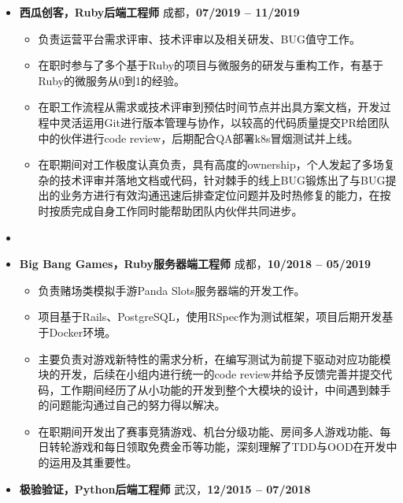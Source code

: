 \documentclass[11pt, a4paper,sans]{moderncv}   %
\begin{document}
\begin{itemize}
\item{\yahei \textbf{西瓜创客，Ruby后端工程师} \hfill 成都，\textbf{07/2019 -- 11/2019}}
\begin{itemize}\yahei
  \item 负责运营平台需求评审、技术评审以及相关研发、BUG值守工作。
  \item 在职时参与了多个基于Ruby的项目与微服务的研发与重构工作，有基于Ruby的微服务从0到1的经验。
  \item 在职工作流程从需求或技术评审到预估时间节点并出具方案文档，开发过程中灵活运用Git进行版本管理与协作，以较高的代码质量提交PR给团队中的伙伴进行code review，后期配合QA部署k8s冒烟测试并上线。
  \item 在职期间对工作极度认真负责，具有高度的ownership，个人发起了多场复杂的技术评审并落地文档或代码，针对棘手的线上BUG锻炼出了与BUG提出的业务方进行有效沟通迅速后排查定位问题并及时热修复的能力，在按时按质完成自身工作同时能帮助团队内伙伴共同进步。
  \end{itemize}

  \vspace{6pt}
\item
  \item{\yahei \textbf{Big Bang Games，Ruby服务器端工程师} \hfill 成都，\textbf{10/2018 -- 05/2019}}
  \begin{itemize}\yahei
    \item 负责赌场类模拟手游Panda Slots服务器端的开发工作。
    \item 项目基于Rails、PostgreSQL，使用RSpec作为测试框架，项目后期开发基于Docker环境。
    \item 主要负责对游戏新特性的需求分析，在编写测试为前提下驱动对应功能模块的开发，后续在小组内进行统一的code review并给予反馈完善并提交代码，工作期间经历了从小功能的开发到整个大模块的设计，中间遇到棘手的问题能沟通过自己的努力得以解决。
    \item 在职期间开发出了赛事竞猜游戏、机台分级功能、房间多人游戏功能、每日转轮游戏和每日领取免费金币等功能，深刻理解了TDD与OOD在开发中的运用及其重要性。
  \end{itemize}

  \vspace{6pt}

  \item{\yahei \textbf{极验验证，Python后端工程师} \hfill 武汉，\textbf{12/2015 -- 07/2018}}


\end{itemize}
\end{document}
